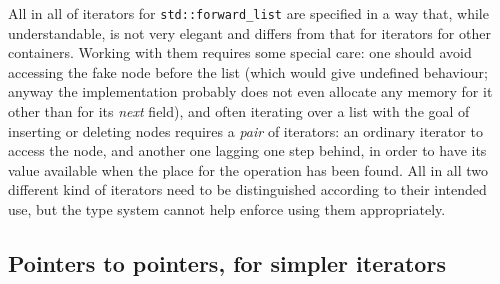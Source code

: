 \documentclass[12pt]{article}
\theoremstyle{plain}
\theoremstyle{definition}
\newcommand\std[1]{\texttt{std::#1}}
\def\frwl.{\std{forward\_list}}
\begin{document}
All in all of iterators for \frwl. are specified in a way that, while
understandable, is not very elegant and differs from that for iterators for
other containers. Working with them requires some special care: one should avoid
accessing the fake node before the list (which would give undefined behaviour;
anyway the implementation probably does not even allocate any memory for it
other than for its \textit{next} field), and often iterating over a list with
the goal of inserting or deleting nodes requires a \emph{pair} of iterators: an
ordinary iterator to access the node, and another one lagging one step behind,
in order to have its value available when the place for the operation has been
found. All in all two different kind of iterators need to be distinguished
according to their intended use, but the type system cannot help enforce using
them appropriately.

\subsection{Pointers to pointers, for simpler iterators}
\end{document}
